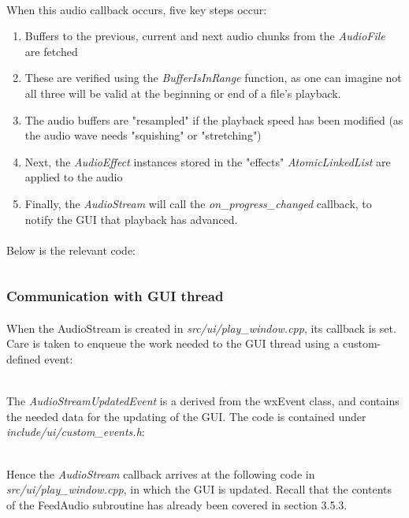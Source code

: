 \pagebreak
 \paragraph{}
 When this audio callback occurs, five key steps occur:
 \begin{enumerate}
 	\item Buffers to the previous, current and next audio chunks from the \textit{AudioFile} are fetched
 	\item These are verified using the \textit{BufferIsInRange} function, as one can imagine not all three will be valid at the beginning or end of a file's playback.
 	\item The audio buffers are "resampled" if the playback speed has been modified (as the audio wave needs "squishing" or "stretching")
 	\item Next, the \textit{AudioEffect} instances stored in the "effects" \textit{AtomicLinkedList} are applied to the audio
 	\item Finally, the \textit{AudioStream} will call the \textit{on\_progress\_changed} callback, to notify the GUI that playback has advanced.
 \end{enumerate}
 
 \paragraph{}
 Below is the relevant code:
 \inputminted[linenos, firstline=68, lastline=177]{c++}{../src/io/audio_stream.cpp}
  
 \pagebreak
 \subsubsection{Communication with GUI thread}
 \paragraph{}
 When the AudioStream is created in \textit{src/ui/play\_window.cpp}, its callback is set. Care is taken to enqueue the work needed to the GUI thread using a custom-defined event:
 \inputminted[linenos, firstline=341, lastline=345]{c++}{../src/ui/play_window.cpp}
 
 \paragraph{}
 The \textit{AudioStreamUpdatedEvent} is a derived from the wxEvent class, and contains the needed data for the updating of the GUI. The code is contained under \textit{include/ui/custom\_events.h}:
 \inputminted[linenos]{c++}{../include/ui/custom_events.h}
 
 \pagebreak
 \paragraph{}
Hence the \textit{AudioStream} callback arrives at the following code in \textit{src/ui/play\_window.cpp}, in which the GUI is updated. Recall that the contents of the FeedAudio subroutine has already been covered in section 3.5.3.
\inputminted[linenos, firstline=350, lastline=362]{c++}{../src/ui/play_window.cpp}
 